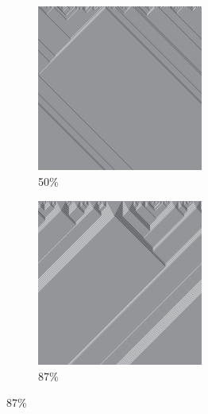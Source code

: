 \documentclass[12pt, fleqn]{report}                             %
\theoremstyle{break}                                            %
\begin{document}
\begin{figure}[ht!]
\begin{subfigure}[b]{0.4\linewidth}
          \includegraphics[width=0.6\textwidth]{Images/57/c.png}
          \caption{50\%}
        \end{subfigure}
        \begin{subfigure}[b]{0.4\linewidth}
          \includegraphics[width=0.6\textwidth]{Images/57/d.png}
          \caption{87\%}
        \end{subfigure}
      \end{figure}
\end{document}
